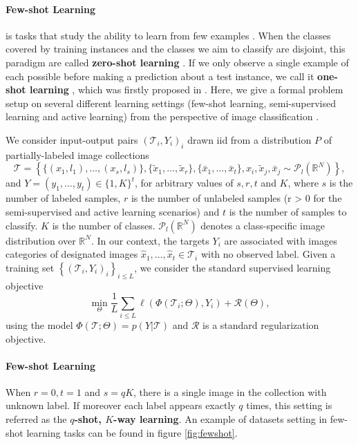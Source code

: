 \documentclass{article}
\begin{document}
\paragraph{Few-shot Learning} is tasks that study the ability to learn from few examples \cite{garcia2017few}. When the classes covered by training instances and the classes we aim to classify are disjoint, this paradigm are called \textbf{zero-shot learning} \cite{wang2019survey}. If we only observe a single example of each possible before making a prediction about a test instance, we call it \textbf{one-shot learning} \cite{koch2015siamese}, which was firstly proposed in \cite{fei2006one}. Here, we give a formal problem setup on several different learning settings (few-shot learning, semi-supervised learning and active learning) from the perspective of image classification \cite{garcia2017few}. 

We consider input-output pairs $(\mathcal{T}_i,Y_i)_i$ drawn iid from a distribution $P$ of partially-labeled image collections 
\[
\mathcal{T}=\left\{ \{(x_1,l_1),\dots,(x_s,l_s)\}, \{\tilde{x}_1,\dots,\tilde{x}_r \}, \{\bar{x}_1,\dots,\bar{x}_t \},  x_i,\tilde{x}_j,\bar{x}_j\sim\mathcal{P}_l(\mathbb{R}^N)\right\},
\]
and $Y=(y_1,\dots,y_t)\in\{1,K\}^t$, for arbitrary values of $s,r,t$ and $K$, where $s$ is the number of labeled samples, $r$ is the number of unlabeled samples (r > 0 for the semi-supervised and active learning scenarios) and $t$ is the number of samples to classify. $K$ is the number of classes. $\mathcal{P}_l(\mathbb{R}^N)$ denotes a class-specific image distribution over $\mathbb{R}^N$. In our context, the targets $Y_i$ are associated with images categories of designated images $\hat{x}_1,\dots,\hat{x}_t\in \mathcal{T}_i$ with no observed label. Given a training set $\left\{(\mathcal{T}_i,Y_i)_i \right\}_{i\leq L}$, we consider the standard supervised learning objective
\[
\min_{\Theta}\frac{1}{L}\sum_{i\leq L}\ell(\Phi(\mathcal{T}_i;\Theta),Y_i)+\mathcal{R}(\Theta),
\]
using the model $\Phi(\mathcal{T};\Theta)=p(Y|\mathcal{T})$ and $\mathcal{R}$ is a standard regularization objective.

\paragraph{Few-shot Learning} When $r=0,t=1$ and $s=qK$, there is a single image in the collection with unknown label. If moreover each label appears exactly $q$ times, this setting is referred as the \textbf{$q$-shot, $K$-way learning}. An example of datasets setting in few-shot learning tasks can be found in figure \ref{fig:fewshot}.
\end{document}
